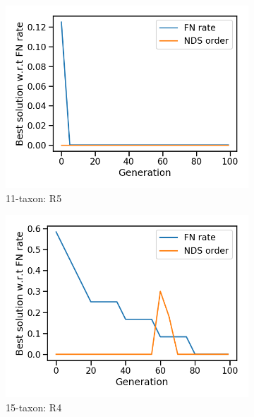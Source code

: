 \begin{figure}[!h]
	\centering
\begin{subfigure}[b]{0.33\textwidth}
		\includegraphics[width=\textwidth]{Figure/11-taxon_R5_runx_nds_order}
		\caption{11-taxon: R5}
\end{subfigure}\begin{subfigure}[b]{0.33\textwidth}
		\includegraphics[width=\textwidth]{Figure/15-taxon_R4_run2_nds_order}
		\caption{15-taxon: R4}
\end{subfigure}\begin{subfigure}[b]{0.33\textwidth}

\end{subfigure}
\end{figure}
